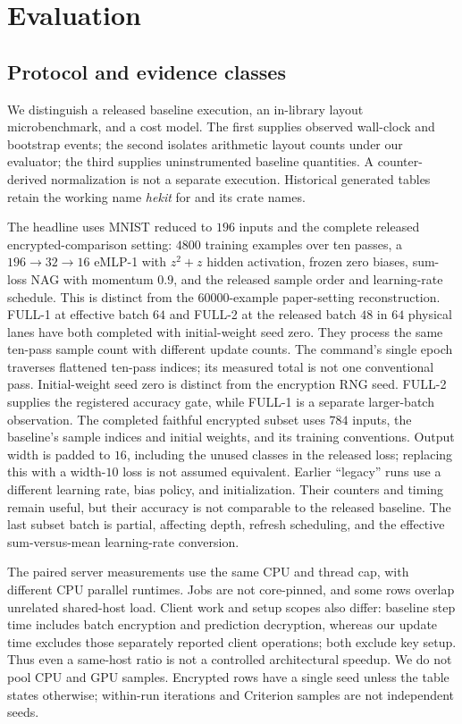 \section{Evaluation}
\label{sec:evaluation}
\subsection{Protocol and evidence classes}
We distinguish a released baseline execution, an in-library layout microbenchmark, and a cost model. The first supplies observed wall-clock and bootstrap events; the second isolates arithmetic layout counts under our evaluator; the third supplies uninstrumented baseline quantities. A counter-derived normalization is not a separate execution. Historical generated tables retain the working name \emph{hekit} for \sys{} and its crate names.

The headline uses MNIST reduced to $196$ inputs and the complete released encrypted-comparison setting: $4800$ training examples over ten passes, a $196\!\to\!32\!\to\!16$ eMLP-1 with $z^2+z$ hidden activation, frozen zero biases, sum-loss NAG with momentum $0.9$, and the released sample order and learning-rate schedule. This is distinct from the $60000$-example paper-setting reconstruction. FULL-1 at effective batch $64$ and FULL-2 at the released batch $48$ in $64$ physical lanes have both completed with initial-weight seed zero. They process the same ten-pass sample count with different update counts. The command's single epoch traverses flattened ten-pass indices; its measured total is not one conventional pass. Initial-weight seed zero is distinct from the encryption RNG seed. FULL-2 supplies the registered accuracy gate, while FULL-1 is a separate larger-batch observation. The completed faithful encrypted subset uses $784$ inputs, the baseline's sample indices and initial weights, and its training conventions. Output width is padded to $16$, including the unused classes in the released loss; replacing this with a width-$10$ loss is not assumed equivalent. Earlier ``legacy'' runs use a different learning rate, bias policy, and initialization. Their counters and timing remain useful, but their accuracy is not comparable to the released baseline. The last subset batch is partial, affecting depth, refresh scheduling, and the effective sum-versus-mean learning-rate conversion.

The paired server measurements use the same CPU and thread cap, with different CPU parallel runtimes. Jobs are not core-pinned, and some rows overlap unrelated shared-host load. Client work and setup scopes also differ: baseline step time includes batch encryption and prediction decryption, whereas our update time excludes those separately reported client operations; both exclude key setup. Thus even a same-host ratio is not a controlled architectural speedup. We do not pool CPU and GPU samples. Encrypted rows have a single seed unless the table states otherwise; within-run iterations and Criterion samples are not independent seeds.

